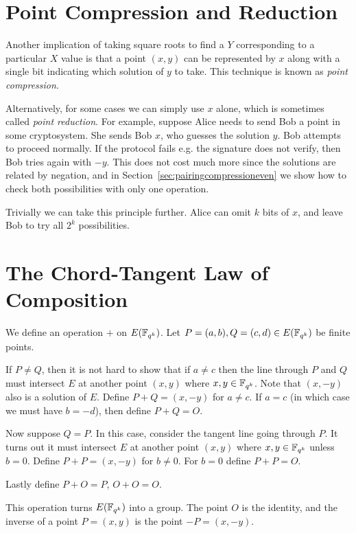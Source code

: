 \section {Point Compression and Reduction}

Another implication of taking square roots to find a $Y$ corresponding to
a particular $X$ value is that
a point $(x,y)$ can be represented by $x$ along with a single bit indicating
which solution of $y$ to take. This technique is known as \emph{point
compression}.

Alternatively, for some cases we can simply use $x$ alone, which
is sometimes called \emph{point reduction}. For example,
suppose Alice needs to send Bob a point in some cryptosystem. She sends
Bob $x$, who guesses the solution $y$. Bob attempts to proceed normally.
If the protocol fails e.g. the signature does not verify, then Bob tries again
with $-y$. This does not cost much more since the solutions are
related by negation, and in Section~\ref{sec:pairingcompressioneven}
we show how to check both possibilities with only one operation.

Trivially we can take this principle further. Alice can
omit $k$ bits of $x$, and leave Bob to try all $2^k$ possibilities.

\section {The Chord-Tangent Law of Composition}

We define an operation $+$ on $E(\mathbb{F}_{q^k})$.
Let $P = (a,b), Q = (c,d) \in E(\mathbb{F}_{q^k})$ be finite points.

If $P \ne Q$, then it is not hard to show that if $a \ne c$
then the line through $P$ and $Q$ must intersect $E$ at another point
$(x,y)$ where $x, y\in \mathbb{F}_{q^k}$. Note that $(x,-y)$ also is a solution of $E$.
Define $P + Q = (x, -y)$ for $a \ne c$.
If $a = c$ (in which case we must have $b = -d$),
then define $P + Q = O$.

Now suppose $Q = P$. In this case, consider the tangent line going through
$P$. It turns out it must intersect $E$ at another point $(x,y)$ where
$x,y\in\mathbb{F}_{q^k}$ unless $b = 0$. Define $P + P = (x, -y)$ for $b \ne 0$.
For $b = 0$ define $P + P = O$.

Lastly define $P + O = P$, $O + O = O$.

This operation turns $E(\mathbb{F}_{q^k})$ into a group.
The point $O$ is the identity, and the inverse
of a point $P = (x,y)$ is the point $-P = (x,-y)$.

